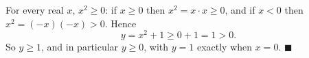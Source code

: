 For every real $x$, $x^2\ge0$: if $x\ge0$ then $x^2=x\cdot x\ge0$, and if $x<0$ then $x^2=(-x)(-x)>0$. Hence
\[
y=x^2+1\ge0+1=1>0 .
\]
So $y\ge1$, and in particular $y\ge0$, with $y=1$ exactly when $x=0$. $\blacksquare$
